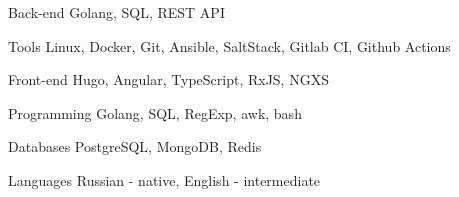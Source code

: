 
\begin{cvskills}

  \cvskill
    {Back-end} %
    {Golang, SQL, REST API} %

  \cvskill
    {Tools} %
    {Linux, Docker, Git, Ansible, SaltStack, Gitlab CI, Github Actions} %

  \cvskill
    {Front-end} %
    {Hugo, Angular, TypeScript, RxJS, NGXS} %

  \cvskill
    {Programming} %
    {Golang, SQL, RegExp, awk, bash} %

  \cvskill
    {Databases} %
    {PostgreSQL, MongoDB, Redis} %

  \cvskill
    {Languages} %
    {Russian - native, English - intermediate } %

\end{cvskills}
